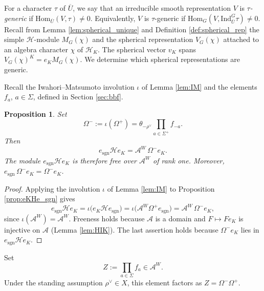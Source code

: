 \documentclass[12pt]{article}
\numberwithin{equation}{section}
\newtheorem{proposition}[theorem]{Proposition}
\theoremstyle{definition}
\theoremstyle{remark}
\theoremstyle{plain}
\begin{document}
For a character $\tau$ of $\overline{U}$, we say that an irreducible smooth representation $V$ is \emph{$\tau$-generic} if $\mathrm{Hom}_{\overline{U}}(V, \tau) \neq 0$. Equivalently, $V$ is $\tau$-generic if $\mathrm{Hom}_G(V, \mathrm{Ind}_{\overline{U}}^G\tau) \neq 0$. Recall from Lemma \ref{lem:spherical_unique} and Definition \ref{def:spherical_rep} the simple $\mathcal{H}$-module $M_G(\chi)$ and the spherical representation $V_G(\chi)$ attached to an algebra character $\chi$ of $\mathcal{H}_K$. The spherical vector $v_K$ spans $V_G(\chi)^K = e_K M_G(\chi)$. We determine which spherical representations are generic.

Recall the Iwahori--Matsumoto involution $\iota$ of Lemma \ref{lem:IM} and the elements $f_a$, $a\in\Sigma$, defined in Section \ref{sec:bbf}.

\begin{proposition}\label{prop:esgnHeK}
Set
$$\Omega^{-} := \iota(\Omega^{+}) = \theta_{-\rho^\vee}\prod_{a\in\Sigma^+}f_{-a}.$$
Then
$$e_{\mathrm{sgn}}\mathcal{H}e_K = \mathcal{A}^W\,\Omega^{-} e_K.$$
The module $e_{\mathrm{sgn}}\mathcal{H}e_K$ is therefore free over $\mathcal{A}^W$ of rank one. Moreover, $e_{\mathrm{sgn}}\,\Omega^- e_K = \Omega^- e_K$.
\end{proposition}
\begin{proof}
Applying the involution $\iota$ of Lemma \ref{lem:IM} to Proposition \ref{prop:eKHe_sgn} gives
$$e_{\mathrm{sgn}}\mathcal{H}e_K = \iota\big(e_K \mathcal{H} e_{\mathrm{sgn}}\big) = \iota\big(\mathcal{A}^W \Omega^+ e_{\mathrm{sgn}}\big) = \mathcal{A}^W\, \Omega^- e_K,$$
since $\iota(\mathcal{A}^W) = \mathcal{A}^W$. Freeness holds because $\mathcal{A}$ is a domain and $F \mapsto Fe_K$ is injective on $\mathcal{A}$ (Lemma \ref{lem:HIK}). The last assertion holds because $\Omega^-e_K$ lies in $e_{\mathrm{sgn}}\mathcal{H}e_K$.
\end{proof}

Set
$$Z := \prod_{a \in \Sigma} f_a \in \mathcal{A}^W.$$
Under the standing assumption $\rho^\vee\in X$, this element factors as $Z=\Omega^{-}\Omega^{+}$.
\end{document}
